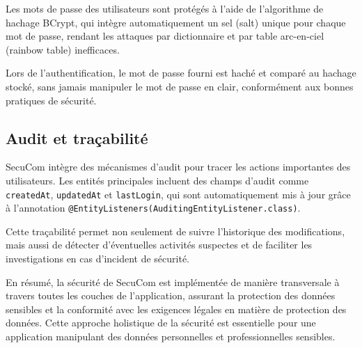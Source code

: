 Les mots de passe des utilisateurs sont protégés à l'aide de l'algorithme de hachage BCrypt, qui intègre automatiquement un sel (salt) unique pour chaque mot de passe, rendant les attaques par dictionnaire et par table arc-en-ciel (rainbow table) inefficaces.

\vspace{0.5cm}

\begin{note}
Lors de l'authentification, le mot de passe fourni est haché et comparé au hachage stocké, sans jamais manipuler le mot de passe en clair, conformément aux bonnes pratiques de sécurité.
\end{note}

\subsection{Audit et traçabilité}

SecuCom intègre des mécanismes d'audit pour tracer les actions importantes des utilisateurs. Les entités principales incluent des champs d'audit comme \texttt{createdAt}, \texttt{updatedAt} et \texttt{lastLogin}, qui sont automatiquement mis à jour grâce à l'annotation \texttt{@EntityListeners(AuditingEntityListener.class)}.

\vspace{0.5cm}

Cette traçabilité permet non seulement de suivre l'historique des modifications, mais aussi de détecter d'éventuelles activités suspectes et de faciliter les investigations en cas d'incident de sécurité.

\vspace{1cm}

\begin{tcolorbox}[
  title={\textbf{Sécurité transversale}},
  colback=blue!5!white,
  colframe=primarycolor,
  fonttitle=\bfseries,
  boxrule=0.5mm,
  arc=2mm,
  left=6mm,
  right=6mm,
  top=6mm,
  bottom=6mm
]
En résumé, la sécurité de SecuCom est implémentée de manière transversale à travers toutes les couches de l'application, assurant la protection des données sensibles et la conformité avec les exigences légales en matière de protection des données. Cette approche holistique de la sécurité est essentielle pour une application manipulant des données personnelles et professionnelles sensibles.
\end{tcolorbox}
